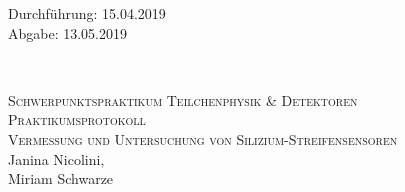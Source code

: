 



\begin{titlepage}
  \begin{flushleft}
 Durchführung: 15.04.2019\\
 Abgabe: 13.05.2019
  \end{flushleft}


\HRule\\[1,0cm]

 \begin{center}

  \textsc{\Large Schwerpunktspraktikum Teilchenphysik \& Detektoren}\\[1.5cm]
\textsc{\LARGE Praktikumsprotokoll}\\[1.5cm]
\textsc{\huge Vermessung und Untersuchung von Silizium-Streifensensoren} \\[5,5cm]

Janina Nicolini\footnotemark[1], \\
Miriam Schwarze\footnotemark[2] \\[1,0cm]



 \end{center}
\HRule

 \vfill

\end{titlepage}



\newpage



\nocite{*}
\printbibliography


